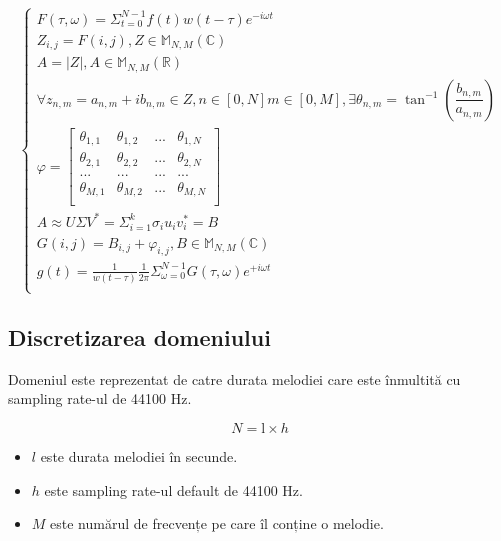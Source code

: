 \documentclass[12pt]{article}
\begin{document}
\begin{equation}
\begin{cases}
F(\tau,\omega) = \Sigma_{t=0}^{N-1} f(t) w(t-\tau) e^{-i\omega t} \\[6pt]
Z_{i,j} = F(i,j) , Z \in \mathbb{M}_{N,M} (\mathbb{C}) \\[6pt]
A = \left| Z \right|, A \in \mathbb{M}_{N,M} (\mathbb{R}) \\[6pt]
\forall z_{n,m}=a_{n,m}+ib_{n,m} \in Z,  n \in [0,N] m \in [0,M], \exists \theta_{n,m}=\tan^{-1}(\dfrac{b_{n,m}}{a_{n,m}})\\[6pt]
\varphi = \begin{bmatrix}
\theta_{1,1} & \theta_{1,2} & ... & \theta_{1,N} \\
\theta_{2,1} & \theta_{2,2} & ... & \theta_{2,N} \\
... & ... & ... & ... \\
\theta_{M,1} & \theta_{M,2} & ... & \theta_{M,N}\\
\end{bmatrix}\\[6pt]
A \approx U\Sigma V^{*} = \Sigma_{i=1}^{k}\sigma_{i}u_{i}v_{i}^{*} = B \\[6pt] 
G(i,j) = B_{i,j} + \varphi_{i,j} , B \in \mathbb{M}_{N,M} (\mathbb{C}) \\[6pt]
g(t) = \frac{1}{w(t-\tau)} \frac{1}{2\pi} \Sigma_{\omega=0}^{N-1} G(\tau,\omega) e^{+i\omega t} \\[6pt]
\end{cases}
\end{equation}

\subsection{Discretizarea domeniului}\label{methods}

Domeniul este reprezentat de catre durata melodiei care este înmultită cu sampling rate-ul de 44100 Hz.

\begin{equation}
N = \text{l} \times h
\end{equation}

\begin{itemize}
	\item $l$ este durata melodiei în secunde.
    \item $h$ este sampling rate-ul default de 44100 Hz.
    \item $M$ este numărul de frecvențe pe care îl conține o melodie.
\end{itemize}
\end{document}
